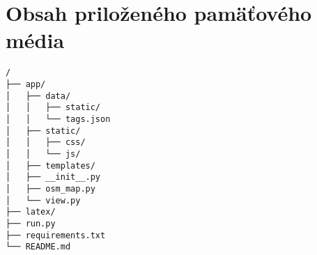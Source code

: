 

\chapter{Obsah priloženého pamäťového média}
\begin{verbatim}
/
├── app/
│   ├── data/
│   │   ├── static/
│   │   └── tags.json
│   ├── static/
│   │   ├── css/
│   │   └── js/
│   ├── templates/
│   ├── __init__.py
│   ├── osm_map.py
│   └── view.py
├── latex/
├── run.py
├── requirements.txt
└── README.md
\end{verbatim}
